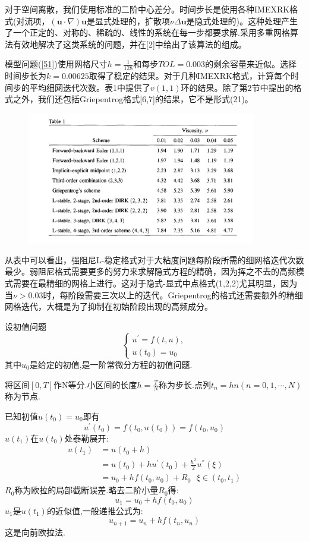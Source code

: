 \documentclass[12pt,a4paper]{article}
\begin{document}
对于空间离散，我们使用标准的二阶中心差分。时间步长是使用各种IMEXRK格式(对流项，$(\mathbf{u}\cdot\nabla)\mathbf{u}$是显式处理的，扩散项$\nu \Delta\mathbf{u}$是隐式处理的)。这种处理产生了一个正定的、对称的、稀疏的、线性的系统在每一步都要求解.采用多重网格算法有效地解决了这类系统的问题，并在[2]中给出了该算法的组成。

模型问题(\ref{51})使用网格尺寸$h=\frac{1}{128}$和每步$TOL=0.003$的剩余容量来近似。选择时间步长为$k=0.00625$取得了稳定的结果。对于几种IMEXRK格式，计算每个时间步的平均细网迭代次数。表1中提供了$v(1,1)$环的结果。除了第2节中提出的格式之外，我们还包括Griepentrog格式[6,7]的结果，它不是形式(21)。

\begin{figure}[H]
\includegraphics[width=10cm]{./figures/6.png}
\centering
\label{Table1}
\end{figure}

从表中可以看出，强阻尼L-稳定格式对于大粘度问题每阶段所需的细网格迭代次数最少。弱阻尼格式需要更多的努力来求解隐式方程的精确，因为挥之不去的高频模式需要在最精细的网格上进行。这对于隐式-显式中点格式(1,2,2)尤其明显，因为当$\nu >0.03$时，每阶段需要三次以上的迭代。Griepentrog的格式还需要额外的精细网格迭代，大概是为了抑制在初始阶段出现的高频成分。


设初值问题
\begin{equation*}
\begin{cases}
u^{'}=f(t,u),\\
u(t_{0})=u_{0}
\end{cases}
\end{equation*}
其中$u_{0}$是给定的初值,是一阶常微分方程的初值问题.

将区间$[0,T]$作N等分.小区间的长度$h=\frac{T}{N}$称为步长.点列$t_{n}=hn(n=0,1,\cdots,N)$称为节点.

已知初值$u(t_{0})=u_{0}$即有
\begin{equation}
u^{'}(t_{0})=f(t_{0},u(t_{0}))=f(t_{0},u_{0})
\end{equation}
$u(t_{1})$在$u(t_{0})$处泰勒展开:
\begin{align}
u(t_{1})&=u(t_{0}+h)\\&=u(t_{0})+hu^{'}(t_{0})+\frac{h^2}{2}u^{''}(\xi)\\&=u_{0}+hf(t_{0},u_{0})+R_{0}~~~\xi\in (t_{0},t_{1})
\end{align}
$R_{0}$称为欧拉的局部截断误差.略去二阶小量$R_{0}$得:
\begin{equation}
u_{1}=u_{0}+hf(t_{0},u_{0})
\end{equation}
$u_{1}$是$u(t_{1})$的近似值,一般递推公式为:
\begin{equation}
u_{n+1}=u_{n}+hf(t_{n},u_{n})
\label{1}
\end{equation}
这是向前欧拉法.
\end{document}
